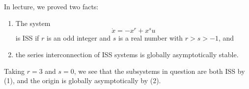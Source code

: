 \documentclass{homework}
\begin{document}
In lecture, we proved two facts:
\begin{enumerate}
    \item The system
    \begin{equation*}
        \dot{x} = -x^r + x^s u
    \end{equation*}
    is ISS if $r$ is an odd integer and $s$ is a real number with $r > s > -1$, and

    \item the series interconnection of ISS systems is globally asymptotically stable.
\end{enumerate}

Taking $r = 3$ and $s=0$, we see that the subsystems in question are both ISS by (1),
and the origin is globally asymptotically by (2).
\end{document}
